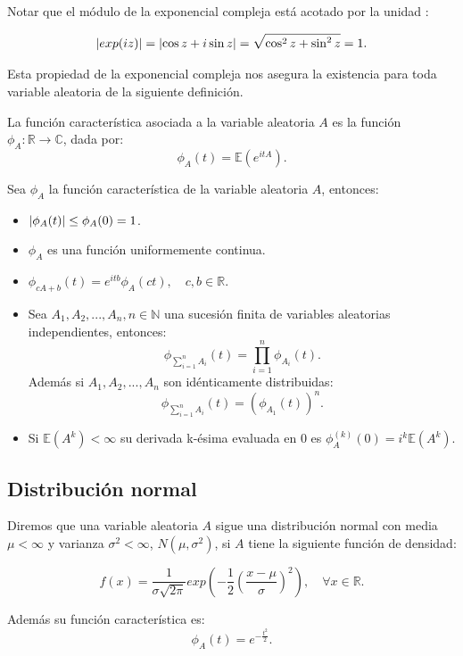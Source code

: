\documentclass[../proyecto.tex]{memoir}
\begin{document}
Notar que el módulo de la exponencial compleja está acotado por la unidad :

$$
\abs{ exp(iz) } = \abs{\cos z+i\sin z} = \sqrt{\cos^2 z + \sin^2 z} = 1.
$$

Esta propiedad de la exponencial compleja nos asegura la existencia para toda variable aleatoria de la siguiente definición.

\begin{defi}
La función característica asociada a la variable aleatoria $A$ es la función $\phi_{A}: \mathds{R} \to \mathds{C}$, dada por:
$$
\phi_{A}(t) = \mathds{E}(e^{itA}).
$$
\end{defi}

\begin{prop}
Sea $\phi_A$ la función característica de la variable aleatoria $A$, entonces:

\begin{itemize}
\item $\abs{\phi_A(t)} \leq \phi_A(0)=1$.
\item $\phi_A$ es una función uniformemente continua.
\item $\phi_{cA+b}(t)=e^{itb}\phi_A(ct), \quad c,b\in \mathds{R}$.
\item Sea $A_1, A_2,...,A_n, n\in\mathds{N}$ una sucesión finita de variables aleatorias independientes, entonces: $$ 
\phi_{\sum^{n}_{i=1} A_i} (t) = \prod_{i=1}^{n} \phi_{A_i} (t) .
$$ Además si $A_1, A_2,...,A_n$ son idénticamente distribuidas: $$
\phi_{\sum^{n}_{i=1} A_i} (t) = \left( \phi_{A_1}(t) \right)^{n}.
$$
\item Si $\mathds{E}(A^k) < \infty$ su derivada k-ésima evaluada en 0 es $\phi_A^{(k)}(0)=i^k\mathds{E}(A^k)$.
\end{itemize}

\end{prop}

\subsection{Distribución normal}

\begin{defi} \label{normal}
Diremos que una variable aleatoria $A$ sigue una distribución normal con media $\mu < \infty$ y varianza $\sigma^2 < \infty$, $N(\mu,\sigma^2)$, si $A$ tiene la siguiente función de densidad: 

$$
f(x) = \frac{1}{ \sigma \sqrt{ 2 \pi }} exp \left( -\frac{1}{2}\left( \frac{x-\mu}{\sigma} \right)^2 \right),\quad \forall x \in \mathds{R}.
$$

Además su función característica es: $$
 \phi_{A}(t)=e^{-\frac{t^2}{2}}.
$$
\end{defi}
\end{document}
